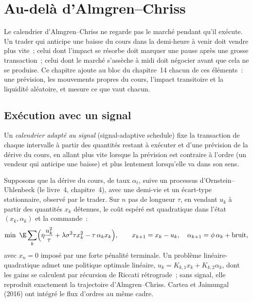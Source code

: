 \chapter{Au-delà d'Almgren--Chriss}\label{ch:mx:beyond-almgren-chriss}

Le calendrier d'Almgren--Chriss ne regarde pas le marché pendant qu'il exécute. Un trader qui anticipe une baisse du cours dans la demi-heure à venir doit vendre
plus vite~; celui dont l'impact se résorbe doit marquer une pause après une grosse transaction~; celui dont le marché s'assèche à midi doit négocier avant que cela ne se produise. Ce chapitre ajoute
au bloc du chapitre~14 chacun de ces éléments~: une prévision, les mouvements propres du cours, l'impact transitoire et la liquidité aléatoire, et mesure ce que vaut chacun.

\section{Exécution avec un signal}

\begin{definition}\label{def:mx:beyond-almgren-chriss:signal}
Un \emph{calendrier adapté au signal} (signal-adaptive schedule) fixe la transaction de chaque intervalle à partir des quantités restant à exécuter et d'une prévision de la dérive du cours,
en allant plus vite lorsque la prévision est contraire à l'ordre (un vendeur qui anticipe une baisse) et plus lentement lorsqu'elle va dans son sens.
\end{definition}

Supposons que la dérive du cours, de taux $\alpha_t$, suive un processus d'Ornstein--Uhlenbeck (le livre~4, chapitre~4), avec une demi-vie et un
écart-type stationnaire, observé par le trader. Sur $n$ pas de longueur $\tau$, en vendant $u_k$ à partir des quantités $x_k$ détenues, le coût espéré est quadratique dans l'état
$(x_k,\alpha_k)$ et la commande~: 
\[
\min\ \E\sum_k\Bigl(\eta\frac{u_k^2}{\tau}+\lambda\sigma^2\tau x_k^2-\tau\,\alpha_kx_k\Bigr),\qquad x_{k+1}=x_k-u_k,\quad \alpha_{k+1}=\phi\,\alpha_k+\text{bruit},
\]
avec $x_n=0$ imposé par une forte pénalité terminale. Un problème linéaire-quadratique admet une politique optimale linéaire, $u_k=K_{k,1}x_k+K_{k,2}\alpha_k$, dont les gains se calculent par
récursion de Riccati rétrograde~; sans signal, elle reproduit exactement la trajectoire d'Almgren--Chriss. Cartea et Jaimungal (2016) ont intégré le flux d'ordres au
même cadre.

